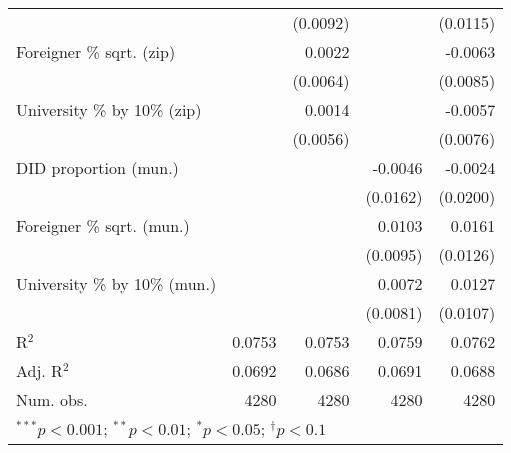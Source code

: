 \begin{tabular}{l D{.}{.}{4.7} D{.}{.}{4.7} D{.}{.}{4.7} D{.}{.}{4.7}}
                                  &               & (0.0092)      &               & (0.0115)      \\
Foreigner \% sqrt. (zip)          &               & 0.0022        &               & -0.0063       \\
                                  &               & (0.0064)      &               & (0.0085)      \\
University \% by 10\% (zip)       &               & 0.0014        &               & -0.0057       \\
                                  &               & (0.0056)      &               & (0.0076)      \\
DID proportion (mun.)             &               &               & -0.0046       & -0.0024       \\
                                  &               &               & (0.0162)      & (0.0200)      \\
Foreigner \% sqrt. (mun.)         &               &               & 0.0103        & 0.0161        \\
                                  &               &               & (0.0095)      & (0.0126)      \\
University \% by 10\% (mun.)      &               &               & 0.0072        & 0.0127        \\
                                  &               &               & (0.0081)      & (0.0107)      \\
\midrule
R$^2$                             & 0.0753        & 0.0753        & 0.0759        & 0.0762        \\
Adj. R$^2$                        & 0.0692        & 0.0686        & 0.0691        & 0.0688        \\
Num. obs.                         & 4280          & 4280          & 4280          & 4280          \\
\bottomrule
{}
\end{tabular}
